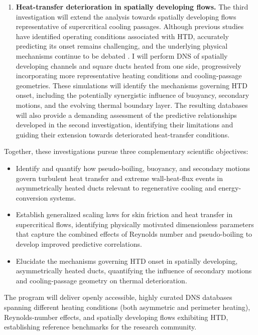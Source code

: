 \documentclass[11pt]{article}
\begin{document}
\begin{enumerate}
	\item \textbf{Heat-transfer deterioration in spatially developing flows.}
	The third investigation will extend the analysis towards spatially developing flows representative of supercritical cooling passages.
	Although previous studies have identified operating conditions associated with HTD, accurately predicting its onset remains challenging, and the underlying physical mechanisms continue to be debated \cite{Nasuti2021,Li2025}.
	I will perform DNS of spatially developing channels and square ducts heated from one side, progressively incorporating more representative heating conditions and cooling-passage geometries.
	These simulations will identify the mechanisms governing HTD onset, including the potentially synergistic influence of buoyancy, secondary motions, and the evolving thermal boundary layer.
	The resulting databases will also provide a demanding assessment of the predictive relationships developed in the second investigation, identifying their limitations and guiding their extension towards deteriorated heat-transfer conditions.
\end{enumerate}
Together, these investigations pursue three complementary scientific objectives:
\begin{itemize}
	\item[\textbf{O1.}] Identify and quantify how pseudo-boiling, buoyancy, and secondary motions govern turbulent heat transfer and extreme wall-heat-flux events in asymmetrically heated ducts relevant to regenerative cooling and energy-conversion systems.
	
	\item[\textbf{O2.}] Establish generalized scaling laws for skin friction and heat transfer in supercritical flows, identifying physically motivated dimensionless parameters that capture the combined effects of Reynolds number and pseudo-boiling to develop improved predictive correlations.
	
	\item[\textbf{O3.}] Elucidate the mechanisms governing HTD onset in spatially developing, asymmetrically heated ducts, quantifying the influence of secondary motions and cooling-passage geometry on thermal deterioration.
\end{itemize}
The program will deliver openly accessible, highly curated DNS databases spanning different heating conditions (both asymmetric and perimeter heating), Reynolds-number effects, and spatially developing flows exhibiting HTD, establishing reference benchmarks for the research community.
\end{document}
